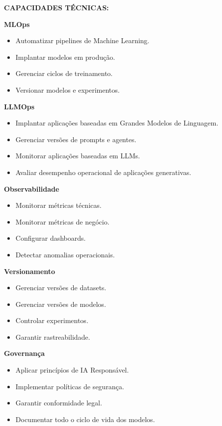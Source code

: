 \textbf{CAPACIDADES TÉCNICAS:}

\textbf{MLOps}

\begin{itemize}
\item Automatizar pipelines de Machine Learning.
\item Implantar modelos em produção.
\item Gerenciar ciclos de treinamento.
\item Versionar modelos e experimentos.
\end{itemize}

\textbf{LLMOps}

\begin{itemize}
\item Implantar aplicações baseadas em Grandes Modelos de Linguagem.
\item Gerenciar versões de prompts e agentes.
\item Monitorar aplicações baseadas em LLMs.
\item Avaliar desempenho operacional de aplicações generativas.
\end{itemize}

\textbf{Observabilidade}

\begin{itemize}
\item Monitorar métricas técnicas.
\item Monitorar métricas de negócio.
\item Configurar dashboards.
\item Detectar anomalias operacionais.
\end{itemize}

\textbf{Versionamento}

\begin{itemize}
\item Gerenciar versões de datasets.
\item Gerenciar versões de modelos.
\item Controlar experimentos.
\item Garantir rastreabilidade.
\end{itemize}

\textbf{Governança}

\begin{itemize}
\item Aplicar princípios de IA Responsável.
\item Implementar políticas de segurança.
\item Garantir conformidade legal.
\item Documentar todo o ciclo de vida dos modelos.
\end{itemize}

